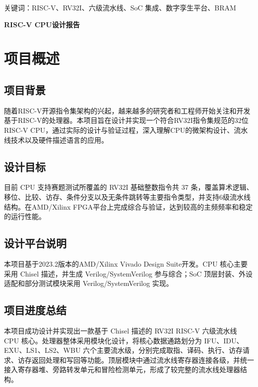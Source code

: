 \documentclass[UTF8,a4paper,zihao=-4]{ctexart}
\begin{document}
关键词：RISC-V、RV32I、六级流水线、SoC 集成、数字孪生平台、BRAM
\clearpage
\begin{center}
  {\bfseries RISC-V CPU设计报告}\par
\end{center}
\vspace{0.5em}


\section{项目概述}

\subsection{项目背景}

随着RISC-V开源指令集架构的兴起，越来越多的研究者和工程师开始关注和开发基于RISC-V的处理器。本项目旨在设计并实现一个符合RV32I指令集规范的32位RISC-V CPU，通过实际的设计与验证过程，深入理解CPU的微架构设计、流水线技术以及硬件描述语言的应用。

\subsection{设计目标}

目前 CPU 支持赛题测试所覆盖的 RV32I 基础整数指令共 37 条，覆盖算术逻辑、移位、比较、访存、条件分支以及无条件跳转等主要指令类型，并支持6级流水线结构。在AMD/Xilinx FPGA平台上完成综合与验证，达到较高的主频频率和稳定的运行性能。

\subsection{设计平台说明}

本项目基于2023.2版本的AMD/Xilinx Vivado Design Suite开发。CPU 核心主要采用 Chisel 描述，并生成 Verilog/SystemVerilog 参与综合；SoC 顶层封装、外设适配和部分测试模块采用 Verilog/SystemVerilog 实现。

\subsection{项目进度总结}

本项目成功设计并实现出一款基于 Chisel 描述的 RV32I RISC-V 六级流水线 CPU 核心。处理器整体采用模块化设计，将核心数据通路划分为 IFU、IDU、EXU、LS1、LS2、WBU 六个主要流水级，分别完成取指、译码、执行、访存请求、访存返回处理和写回等功能。顶层模块中通过流水线寄存器连接各级，并统一接入寄存器堆、旁路转发单元和冒险检测单元，形成了较完整的流水线处理器结构。
\end{document}

